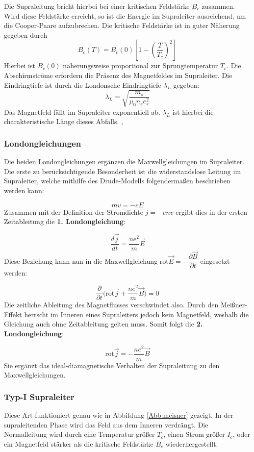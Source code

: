 Die Supraleitung bricht hierbei bei einer kritischen Feldstärke $B_c$ zusammen.
Wird diese Feldstärke erreicht, so ist die Energie im Supraleiter ausreichend,
um die Cooper-Paare aufzubrechen.
Die kritische Feldstärke ist in guter Näherung gegeben durch 
\[
	B_c (T) = B_c (0) \left[ 1- \left(\frac{T}{T_c}\right)^2 \right]
\]
Hierbei ist $B_c(0)$ näherungsweise proportional zur Sprungtemperatur $T_c$.
Die Abschirmströme erfordern die Präsenz des Magnetfeldes im Supraleiter. Die 
Eindringtiefe ist durch die Londonsche Eindringtiefe $\lambda_L$ gegeben:
\[
	\lambda_L = \sqrt{ \frac{m_s}{\mu_0 n_s e_s^2} }
\]
Das Magnetfeld fällt im Supraleiter exponentiell ab. $\lambda_L$ ist hierbei 
die charakteristische Länge dieses Abfalls.
\cite{hunklinger}, \cite{meisnerwiki}

	\subsubsection{Londongleichungen}
Die beiden Londongleichungen ergänzen die Maxwellgleichungen im Supraleiter. Die erste zu berücksichtigende Besonderheit ist die widerstandslose Leitung im Supraleiter, welche mithilfe des Drude-Modells folgendermaßen beschrieben werden kann:

\[m\dot{v}=-eE\]
Zusammen mit der Definition der Stromdichte $j=-env$ ergibt dies in der ersten Zeitableitung die \textbf{1. Londongleichung}:

\[\dfrac{d\vec{j}}{dt}=\dfrac{ne^2}{m}\vec{E}\]	
Diese Beziehung kann nun in die Maxwellgleichung $\text{rot}\vec{E}=-\dfrac{\partial\vec{B}}{\partial t}$ eingesetzt werden:

\[\dfrac{\partial}{\partial t}\big(\text{rot}\vec{j}+\dfrac{ne^2}{m}\vec{B}\big)=0\]
Die zeitliche Ableitung des Magnetflusses verschwindet also. Durch den Meißner-Effekt herrscht im Inneren eines Supraleiters jedoch kein Magnetfeld, weshalb die Gleichung auch ohne Zeitableitung gelten muss. Somit folgt die \textbf{2. Londongleichung}:

\[\text{rot}\vec{j}=-\dfrac{ne^2}{m}\vec{B}\]
Sie ergänzt das ideal-diamagnetische Verhalten der Supraleitung zu den Maxwellgleichungen.


		\subsubsection{Typ-I Supraleiter}
Diese Art funktioniert genau wie in Abbildung \ref{Abb:meisner} gezeigt. In der 
supraleitenden Phase wird das Feld aus dem Inneren verdrängt. Die Normalleitung 
wird durch eine Temperatur größer $T_c$, einen Strom größer $I_c$, oder ein
Magnetfeld stärker als die kritische Feldstärke $B_c$ wiederhergestellt. 
\cite{hunklinger}

